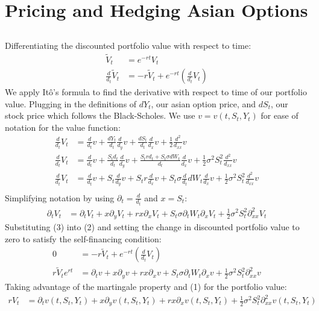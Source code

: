 \documentclass[a4paper,12pt]{article}
\begin{document}
\section{Pricing and Hedging Asian Options}



\subsection{}

\subsubsection{}

Differentiating the discounted portfolio value with respect to time:
\begin{align}
\tilde{V}_t &= e^{-rt}V_t \\
\frac{d}{d_t}\tilde{V}_t &= -r \tilde{V}_t + e^{-rt} ( \frac{d}{d_t}V_t)
\end{align}
We apply It\^{o}'s formula to find the derivative with respect to time of our portfolio value. Plugging in the definitions of $dY_t$, our asian option price, and $dS_t$, our stock price which follows the Black-Scholes. We use $v = v(t, S_t, Y_t)$ for ease of notation for the value function:
%
\begin{align*}
\frac{d}{d_t}V_t & = \frac{d}{d_t}v + \frac{dY_t}{d_t}\frac{d}{d_y}v + \frac{dS_t}{d_t}\frac{d}{d_x}v + \frac{1}{2}\frac{d^2}{d_{xx}}v \\
\frac{d}{d_t}V_t &= \frac{d}{d_t}v + \frac{S_td_t}{d_t}\frac{d}{d_y}v + \frac{S_trd_t + S_t \sigma dW_t}{d_t}\frac{d}{d_x}v + \frac{1}{2}\sigma^2 S_t^2 \frac{d^2}{d_{xx}}v\\
\frac{d}{d_t}V_t &= \frac{d}{d_t}v + S_t \frac{d}{d_y}v + S_tr\frac{d}{d_x}v + S_t \sigma \frac{d}{d_t}dW_t \frac{d}{d_x}v + \frac{1}{2}\sigma^2 S_t^2 \frac{d^2}{d_{xx}}v\\
\end{align*}
%
Simplifying notation by using $\partial_t = \frac{d}{d_t}$ and $x = S_t$:
\begin{align}
\partial_t V_t &= \partial_t V_t + x \partial_y V_t + rx \partial_x V_t + S_t \sigma \partial_tW_t \partial_xV_t + \frac{1}{2}\sigma^2 S_t^2 \partial_{xx}^2 V_t
\end{align}
%
Substituting (3) into (2) and setting the change in discounted portfolio value to zero to satisfy the self-financing condition:
%
\begin{align*}
0 &= -r \tilde{V}_t + e^{-rt} ( \frac{d}{d_t}V_t) \\
r \tilde{V}_t e^{rt} &= \partial_t v + x \partial_y v + rx \partial_x v + S_t \sigma \partial_tW_t \partial_x v + \frac{1}{2}\sigma^2 S_t^2 \partial_{xx}^2 v
\end{align*}
%
Taking advantage of the martingale property and (1) for the portfolio value:
\begin{align*}
rV_t &= \partial_t v(t, S_t, Y_t) + x \partial_y v(t, S_t, Y_t) + rx \partial_x v(t, S_t, Y_t)  + \frac{1}{2}\sigma^2 S_t^2 \partial_{xx}^2 v(t, S_t, Y_t)
\end{align*}
\end{document}
